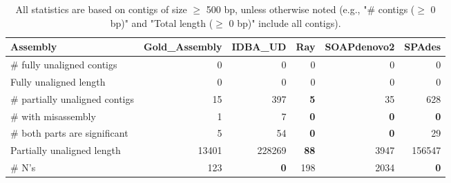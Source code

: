 \documentclass[12pt,a4paper]{article}
\begin{document}
\begin{table}[ht]
\begin{center}
\caption{All statistics are based on contigs of size $\geq$ 500 bp, unless otherwise noted (e.g., "\# contigs ($\geq$ 0 bp)" and "Total length ($\geq$ 0 bp)" include all contigs).}
\begin{tabular}{|l*{5}{|r}|}
\hline
Assembly & Gold\_Assembly & IDBA\_UD & Ray & SOAPdenovo2 & SPAdes \\ \hline
\# fully unaligned contigs & 0 & 0 & 0 & 0 & 0 \\ \hline
Fully unaligned length & 0 & 0 & 0 & 0 & 0 \\ \hline
\# partially unaligned contigs & 15 & 397 & {\bf 5} & 35 & 628 \\ \hline
\hspace{5mm}\# with misassembly & 1 & 7 & {\bf 0} & {\bf 0} & {\bf 0} \\ \hline
\hspace{5mm}\# both parts are significant & 5 & 54 & {\bf 0} & {\bf 0} & 29 \\ \hline
Partially unaligned length & 13401 & 228269 & {\bf 88} & 3947 & 156547 \\ \hline
\# N's & 123 & {\bf 0} & 198 & 2034 & {\bf 0} \\ \hline
\end{tabular}
\end{center}
\end{table}
\end{document}
